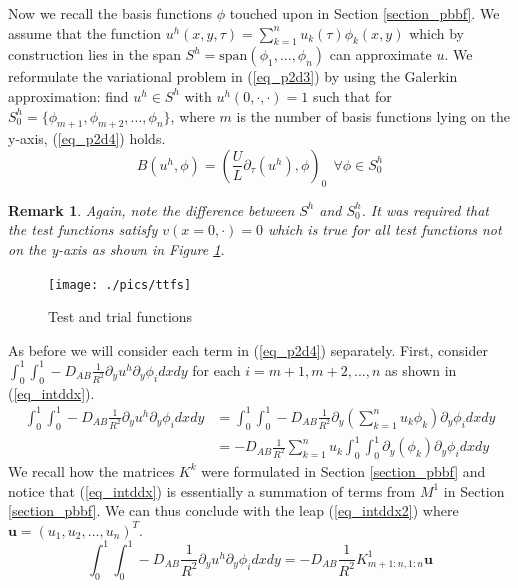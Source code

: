 \documentclass[11pt,fleqn]{article}
\theoremstyle{defstyle}
\newtheorem{rmrk}{Remark}[section]
\begin{document}
Now we recall the basis functions $\phi$ touched upon in Section \ref{section_pbbf}. We assume that the function $u^h(x,y,\tau) =\sum^n_{k=1} u_k(\tau) \phi_k(x, y)$ which by construction lies in the span $S^h=\text{span}(\phi_1,...,\phi_n)$ can approximate $u$. We reformulate the variational problem in (\ref{eq_p2d3}) by using the Galerkin approximation: find $u^h \in S^h$ with $u^h(0,\cdot,\cdot) = 1$ such that for $S^h_0=\{\phi_{m+1}, \phi_{m+2},...,\phi_n \}$, where $m$ is the number of basis functions lying on the y-axis, (\ref{eq_p2d4}) holds.
\begin{equation}
B(u^h,\phi) = (\frac{U}{L} \partial_\tau (u^h), \phi)_0~~ \forall \phi \in S^h_0
\label{eq_p2d4}
\end{equation}
\begin{rmrk}
Again, note the difference between $S^h$ and $S^h_0$. It was required that the test functions satisfy $v(x=0,\cdot)=0$ which is true for all test functions not on the y-axis as shown in Figure \ref{fig_ttfs}. 
\end{rmrk}
\begin{figure}[H] 
\centering
\texttt{[image: ./pics/ttfs]}
\caption{Test and trial functions} 
\label{fig_ttfs}
\end{figure}
As before we will consider each term in (\ref{eq_p2d4}) separately. First, consider $ \int_0^1 \int_0^1 -D_{AB}\frac{1}{R^2}\partial_y u^h \partial_y \phi_i dxdy$ for each $i=m+1, m+2,...,n$ as shown in (\ref{eq_intddx}).
\begin{equation}
\begin{aligned}
\int_0^1 \int_0^1 -D_{AB}\frac{1}{R^2}\partial_y u^h \partial_y \phi_i dxdy &= \int_0^1 \int_0^1 -D_{AB}\frac{1}{R^2}\partial_y \left(\sum^n_{k=1} u_k \phi_k\right) \partial_y \phi_i dxdy \\
&= -D_{AB}\frac{1}{R^2}\sum^n_{k=1} u_k\int_0^1 \int_0^1 \partial_y (\phi_k) \partial_y \phi_i dxdy  
\end{aligned}
\label{eq_intddx}
\end{equation}
We recall how the matrices $K^k$ were formulated in Section \ref{section_pbbf} and notice that (\ref{eq_intddx}) is essentially a summation of terms from $M^1$ in Section \ref{section_pbbf}. We can thus conclude with the leap (\ref{eq_intddx2}) where $\mathbf{u} = \left(u_1,u_2,...,u_n\right)^T$.
\begin{equation}
\int_0^1 \int_0^1 -D_{AB}\frac{1}{R^2}\partial_y u^h \partial_y \phi_i dxdy = -D_{AB}\frac{1}{R^2}K^1_{m+1:n, 1:n}\mathbf{u}
\label{eq_intddx2}
\end{equation}
\end{document}
